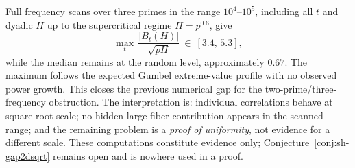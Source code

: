 \begin{remark}
\label{rem:sh-gap2d-evidence}
Full frequency scans over three primes in the range $10^4$--$10^5$,
including all $t$ and dyadic $H$ up to the supercritical regime
$H=p^{0.6}$, give
\[
 \max_t\,\frac{|B_t(H)|}{\sqrt{pH}}\ \in\ [3.4,\,5.3],
\]
while the median remains at the random level, approximately $0.67$.
The maximum follows the expected Gumbel extreme-value profile with no
observed power growth.  This closes the previous numerical gap for the
two-prime/three-frequency obstruction.  The interpretation is:
individual correlations behave at square-root scale; no hidden large
fiber contribution appears in the scanned range; and the remaining
problem is a \emph{proof of uniformity}, not evidence for a different
scale.  These computations constitute evidence only;
Conjecture~\ref{conj:sh-gap2dsqrt} remains open and is nowhere used in
a proof.
\end{remark}

